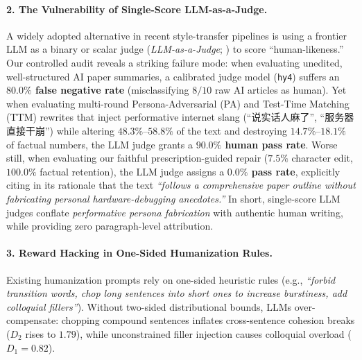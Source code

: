 \documentclass[11pt]{article}
\newcommand{\zh}[1]{#1}
\begin{document}
\paragraph{2. The Vulnerability of Single-Score LLM-as-a-Judge.}
A widely adopted alternative in recent style-transfer pipelines is using a frontier LLM as a binary or scalar judge (\textit{LLM-as-a-Judge}; \citealt{zheng2023judging}) to score ``human-likeness.'' Our controlled audit reveals a striking failure mode: when evaluating unedited, well-structured AI paper summaries, a calibrated judge model (\texttt{hy4}) suffers an \textbf{$80.0\%$ false negative rate} (misclassifying $8/10$ raw AI articles as human). Yet when evaluating multi-round Persona-Adversarial (PA) and Test-Time Matching (TTM) rewrites that inject performative internet slang (\zh{``说实话人麻了''}, \zh{``服务器直接干崩''}) while altering $48.3\%$--$58.8\%$ of the text and destroying $14.7\%$--$18.1\%$ of factual numbers, the LLM judge grants a \textbf{$90.0\%$ human pass rate}. Worse still, when evaluating our faithful prescription-guided repair ($7.5\%$ character edit, $100.0\%$ factual retention), the LLM judge assigns a \textbf{$0.0\%$ pass rate}, explicitly citing in its rationale that the text \textit{``follows a comprehensive paper outline without fabricating personal hardware-debugging anecdotes.''} In short, single-score LLM judges conflate \textit{performative persona fabrication} with authentic human writing, while providing zero paragraph-level attribution.

\paragraph{3. Reward Hacking in One-Sided Humanization Rules.}
Existing humanization prompts \cite{catchme2025} rely on one-sided heuristic rules (e.g., \textit{``forbid transition words, chop long sentences into short ones to increase burstiness, add colloquial fillers''}). Without two-sided distributional bounds, LLMs over-compensate: chopping compound sentences inflates cross-sentence cohesion breaks ($D_2$ rises to $1.79$), while unconstrained filler injection causes colloquial overload ($D_1 = 0.82$).
\end{document}
